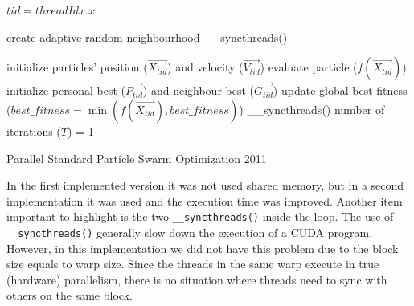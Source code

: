 \documentclass{article}
\begin{document}
    \begin{algorithm}[!htb]
        
        $tid = threadIdx.x\;$

        create adaptive random neighbourhood\;
        \_\_syncthreads()\;

        initialize particles' position ($\vec{X_{tid}}$) and velocity ($\vec{V_{tid}}$)\;
        evaluate particle ($f(\vec{X_{tid}})$)\;
        initialize personal best ($\vec{P_{tid}}$) and neighbour best ($\vec{G_{tid}}$)\;
        update global best fitness ($best\_fitness=\min(f(\vec{X_{tid}}), best\_fitness)$)\;
        \_\_syncthreads()\;
        number of iterations ($T$) = 1\;
        
        
        \caption{Parallel Standard Particle Swarm Optimization 2011}
        \label{alg:pspso2011}
    \end{algorithm}

    In the first implemented version it was not used shared memory, but in a second implementation it was used and the execution time was improved.
    Another item important to highlight is the two \texttt{\_\_syncthreads()} inside the loop.
    The use of \texttt{\_\_syncthreads()} generally slow down the execution of a CUDA program.
    However, in this implementation we did not have this problem due to the block size equals to warp size.
    Since the threads in the same warp execute in true (hardware) parallelism, there is no situation where threads need to sync with others on the same block.
\end{document}
